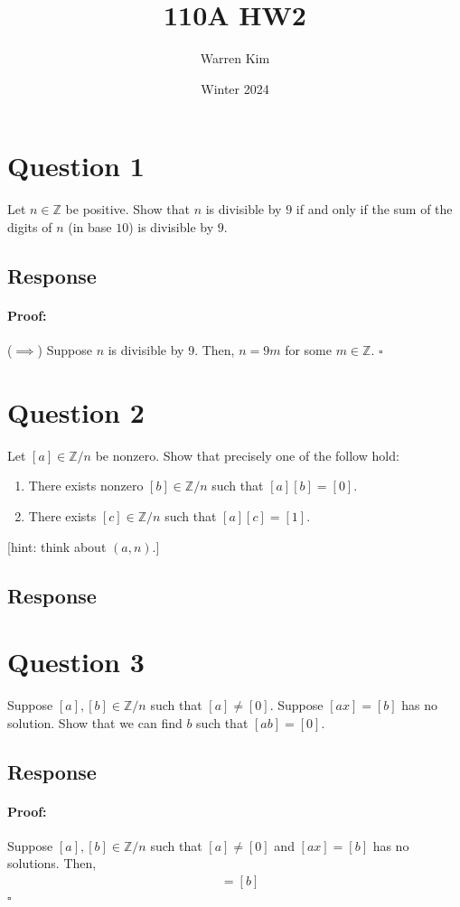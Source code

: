 \documentclass [12pt] {article}
\title{110A HW2}
\author{Warren Kim}
\date{Winter 2024}
\newcommand{\Z}{\mathbb{Z}}
\newenvironment{proof}{\paragraph{Proof:}}{\hfill$\square$}
\begin{document}
\maketitle

\section*{Question 1}
Let $n\in\Z$ be positive. Show that $n$ is divisible by $9$ if and only if the sum of the digits of $n$ (in base $10$) is divisible by $9$. 

\subsection*{Response}
\begin{proof}
    ($\implies$) Suppose $n$ is divisible by 9. Then, $n = 9m$ for some $m \in \Z$.
\end{proof}
\newpage

\section*{Question 2}
Let $[a]\in\Z/n$ be nonzero. Show that precisely one of the follow hold: 
\begin{enumerate}
    \item There exists nonzero $[b]\in\Z/n$ such that $[a][b]=[0]$.
    \item There exists $[c]\in\Z/n$ such that $[a][c]=[1]$.
\end{enumerate}
[hint: think about $(a,n)$.]

\subsection*{Response}
\newpage

\section*{Question 3}
Suppose $[a],[b]\in\Z/n$ such that $[a]\neq [0]$. Suppose $[ax]=[b]$ has no solution. Show that we 
can find $b$ such that $[ab]=[0]$. 

\subsection*{Response}
\begin{proof}
    Suppose $[a], [b] \in \Z/n$ such that $[a] \neq [0]$ and $[ax] = [b]$ has no solutions. Then,
    \begin{align*}
        [ax] &= [b] \\
    \end{align*}
\end{proof}
\newpage
\end{document}
